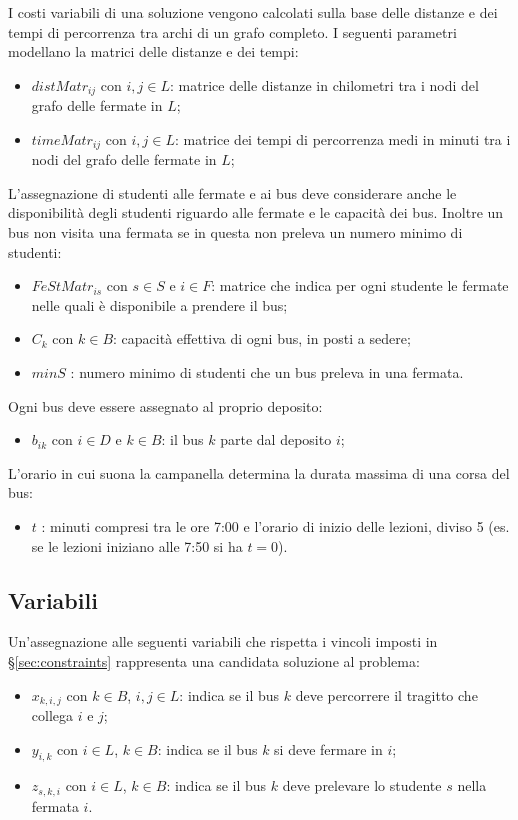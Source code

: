 I costi variabili di una soluzione vengono calcolati sulla base delle distanze e dei tempi di percorrenza tra archi di un grafo completo. I seguenti parametri modellano la matrici delle distanze e dei tempi:
\begin{itemize}
  \item $distMatr_{ij}$ con $i,j \in L$: matrice delle distanze in chilometri tra i nodi del grafo delle fermate in $L$;
  \item $timeMatr_{ij}$ con $i,j \in L$: matrice dei tempi di percorrenza medi in minuti tra i nodi del grafo delle fermate in $L$;
\end{itemize}
L'assegnazione di studenti alle fermate e ai bus deve considerare anche le disponibilità degli studenti riguardo alle fermate e le capacità dei bus. Inoltre un bus non visita una fermata se in questa non preleva un numero minimo di studenti:
\begin{itemize}
\item $FeStMatr_{is}$ con $s \in S$ e $i \in F$: matrice che indica per ogni studente le fermate nelle quali è disponibile a prendere il bus;
\item $C_k$ con $k \in B$: capacità effettiva di ogni bus, in posti a sedere;
\item $minS$ : numero minimo di studenti che un bus preleva in una fermata.
\end{itemize}
Ogni bus deve essere assegnato al proprio deposito:
\begin{itemize}
  \item $b_{ik}$ con $i \in D$ e $k \in B$: il bus $k$ parte dal deposito $i$;
\end{itemize}
L'orario in cui suona la campanella determina la durata massima di una corsa del bus:
\begin{itemize}
  \item $t$ : minuti compresi tra le ore 7:00 e l'orario di inizio delle lezioni, diviso 5 (es. se le lezioni iniziano alle 7:50 si ha $t = 0$).
\end{itemize}


\subsection{Variabili}
\label{subsec:var}
Un'assegnazione alle seguenti variabili che rispetta i vincoli imposti in §\ref{sec:constraints} rappresenta una candidata soluzione al problema:
\begin{itemize}
\item $x_{k,i,j}$ con $k \in B$, $i,j \in L$: indica se il bus $k$ deve percorrere il tragitto che collega $i$ e $j$;
\item $y_{i,k}$ con $i \in L$, $k \in B$: indica se il bus $k$ si deve fermare in $i$;
\item $z_{s,k,i}$ con $i \in L$, $k \in B$: indica se il bus $k$ deve prelevare lo studente $s$ nella fermata $i$.
\end{itemize}


